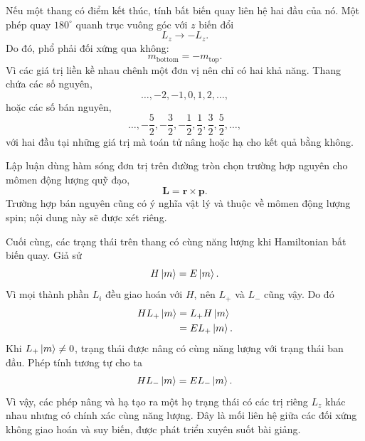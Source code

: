 \begin{classroomqa}
\end{classroomqa}

Nếu một thang có điểm kết thúc, tính bất biến quay liên hệ hai đầu của nó. Một phép quay \(180^\circ\) quanh trục vuông góc với \(z\) biến đổi
\begin{equation}
L_z\longrightarrow-L_z.
\end{equation}
Do đó, phổ phải đối xứng qua không:
\begin{equation}
m_{\mathrm{bottom}}=-m_{\mathrm{top}}.
\end{equation}
Vì các giá trị liền kề nhau chênh một đơn vị nên chỉ có hai khả năng. Thang chứa các số nguyên,
\begin{equation}
\ldots,-2,-1,0,1,2,\ldots,
\end{equation}
hoặc các số bán nguyên,
\begin{equation}
\ldots,-\frac{5}{2},-\frac{3}{2},-\frac{1}{2},
\frac{1}{2},\frac{3}{2},\frac{5}{2},\ldots,
\end{equation}
với hai đầu tại những giá trị mà toán tử nâng hoặc hạ cho kết quả bằng không.

Lập luận dùng hàm sóng đơn trị trên đường tròn chọn trường hợp nguyên cho mômen động lượng quỹ đạo,
\begin{equation}
\mathbf L=\mathbf r\times\mathbf p.
\end{equation}
Trường hợp bán nguyên cũng có ý nghĩa vật lý và thuộc về mômen động lượng spin; nội dung này sẽ được xét riêng.

Cuối cùng, các trạng thái trên thang có cùng năng lượng khi Hamiltonian bất biến quay. Giả sử
\begin{equation}
H\left\lvert m\right\rangle=E\left\lvert m\right\rangle.
\end{equation}
Vì mọi thành phần \(L_i\) đều giao hoán với \(H\), nên \(L_+\) và \(L_-\) cũng vậy. Do đó
\begin{align}
H L_+\left\lvert m\right\rangle
&=L_+H\left\lvert m\right\rangle\\
&=E L_+\left\lvert m\right\rangle.
\end{align}
Khi \(L_+\left\lvert m\right\rangle\neq0\), trạng thái được nâng có cùng năng lượng với trạng thái ban đầu. Phép tính tương tự cho ta
\begin{equation}
H L_-\left\lvert m\right\rangle=E L_-\left\lvert m\right\rangle.
\end{equation}
Vì vậy, các phép nâng và hạ tạo ra một họ trạng thái có các trị riêng \(L_z\) khác nhau nhưng có chính xác cùng năng lượng. Đây là mối liên hệ giữa các đối xứng không giao hoán và suy biến, được phát triển xuyên suốt bài giảng.

